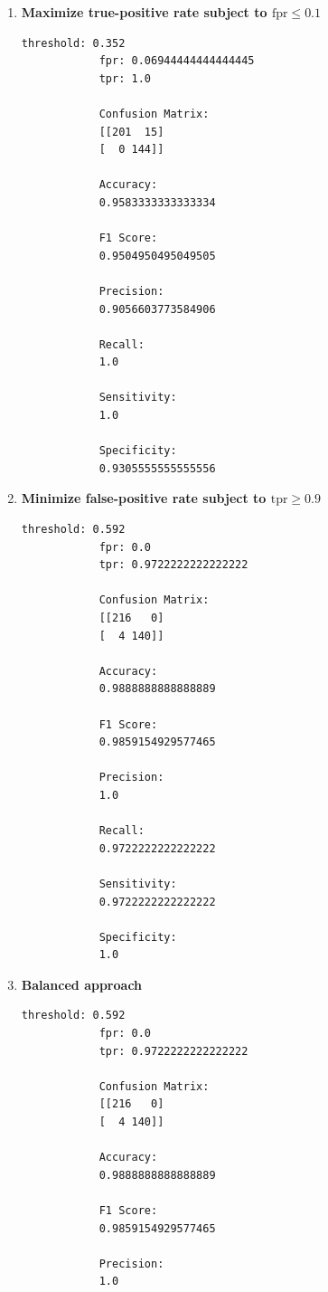 \documentclass[11pt]{article}
\begin{document}
	\begin{enumerate}[label=\roman*.]
		
		\item \textbf{Maximize true-positive rate subject to $\text{fpr} \leq 0.1$}
		
		\begin{lstlisting}[style=matlabstyle]
			threshold: 0.352
			fpr: 0.06944444444444445
			tpr: 1.0
			
			Confusion Matrix:
			[[201  15]
			[  0 144]]
			
			Accuracy:
			0.9583333333333334
			
			F1 Score:
			0.9504950495049505
			
			Precision:
			0.9056603773584906
			
			Recall:
			1.0
			
			Sensitivity:
			1.0
			
			Specificity:
			0.9305555555555556
		\end{lstlisting}
		
		\item \textbf{Minimize false-positive rate subject to $\text{tpr} \geq 0.9$}
		
		\begin{lstlisting}[style=matlabstyle]
			threshold: 0.592
			fpr: 0.0
			tpr: 0.9722222222222222
			
			Confusion Matrix:
			[[216   0]
			[  4 140]]
			
			Accuracy:
			0.9888888888888889
			
			F1 Score:
			0.9859154929577465
			
			Precision:
			1.0
			
			Recall:
			0.9722222222222222
			
			Sensitivity:
			0.9722222222222222
			
			Specificity:
			1.0
		\end{lstlisting}
		
		\item \textbf{Balanced approach}
		
		\begin{lstlisting}[style=matlabstyle]
			threshold: 0.592
			fpr: 0.0
			tpr: 0.9722222222222222
			
			Confusion Matrix:
			[[216   0]
			[  4 140]]
			
			Accuracy:
			0.9888888888888889
			
			F1 Score:
			0.9859154929577465
			
			Precision:
			1.0
			

\end{lstlisting}
\end{enumerate}
\end{document}

